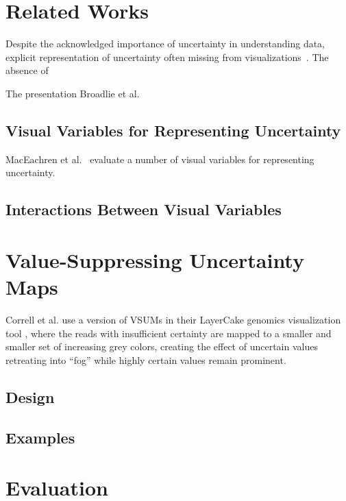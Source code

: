 \documentclass{vgtc}                          %
\begin{document}
\exampleFig 
\section{Related Works}


Despite the acknowledged importance of uncertainty in understanding data, explicit representation of uncertainty often missing from visualizations~\cite{boukhelifa2009uncertainty}. The absence of 
 
The presentation Broadlie et al.~\cite{brodlie2012review}
\subsection{Visual Variables for Representing Uncertainty}

MacEachren et al.~\cite{maceachren2012visual} evaluate a number of visual variables for representing uncertainty. 
\subsection{Interactions Between Visual Variables}

\section{Value-Suppressing Uncertainty Maps}

Correll et al. use a version of VSUMs in their LayerCake genomics visualization tool \cite{correll2015layercake,correll2011visualizing}, where the reads with insufficient certainty are mapped to a smaller and smaller set of increasing grey colors, creating the effect of uncertain values retreating into ``fog'' while highly certain values remain prominent.

\subsection{Design}


\subsection{Examples}

\section{Evaluation}
\end{document}
